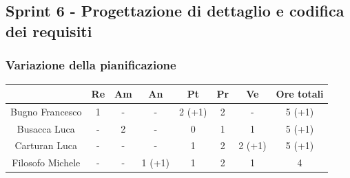 
\subsection{Sprint 6 - Progettazione di dettaglio e codifica dei requisiti} \label{subsection:consuntivo_sprint6}
\subsubsection{Variazione della pianificazione} \label{subsubsection:variazione_pianificazione_sprint6}

\begin{table}[H]
  \centering
  \renewcommand{\arraystretch}{1.8}
  \begin{tabular}{c|c|c|c|c|c|c|c}
    \rowcolor[HTML]{125E28}
    \multicolumn{1}{c}{\color[HTML]{FFFFFF}\textbf{ Nominativo }}
                         & \multicolumn{1}{c}{\color[HTML]{FFFFFF}\textbf{ Re }}
                         & \multicolumn{1}{c}{\color[HTML]{FFFFFF}\textbf{ Am}}
                         & \multicolumn{1}{c}{\color[HTML]{FFFFFF}\textbf{ An }}
                         & \multicolumn{1}{c}{\color[HTML]{FFFFFF}\textbf{ Pt }}
                         & \multicolumn{1}{c}{\color[HTML]{FFFFFF}\textbf{ Pr }}
                         & \multicolumn{1}{c}{\color[HTML]{FFFFFF}\textbf{ Ve }}
                         & \multicolumn{1}{c}{\color[HTML]{FFFFFF}\textbf{ Ore totali }}                                                                                                     \\
    \hline
    Bugno Francesco      & 1                                                             & -          & -               & 2 (+1)          & 2           & -               & 5 (+1)           \\
    Busacca Luca         & -                                                             & 2          & -               & 0               & 1           & 1               & 5 (+1)           \\
    Carturan Luca        & -                                                             & -          & -               & 1               & 2           & 2 (+1)          & 5 (+1)           \\
    Filosofo Michele     & -                                                             & -          & 1 (+1)          & 1               & 2           & 1               & 4                \\

\end{tabular}
\end{table}
